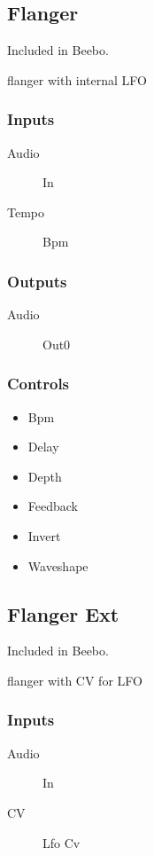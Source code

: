\subsection{Flanger}

Included in Beebo.

flanger with internal LFO



\subsubsection{Inputs}
\begin{description}
\item [Audio] In
\item [Tempo] Bpm
\end{description}

\subsubsection{Outputs}
\begin{description}
\item [Audio] Out0
\end{description}

\subsubsection{Controls}
\begin{itemize}
\item Bpm
\item Delay
\item Depth
\item Feedback
\item Invert
\item Waveshape
\end{itemize}

\subsection{Flanger Ext}

Included in Beebo.

flanger with CV for LFO



\subsubsection{Inputs}
\begin{description}
\item [Audio] In
\item [CV] Lfo Cv
\end{description}

